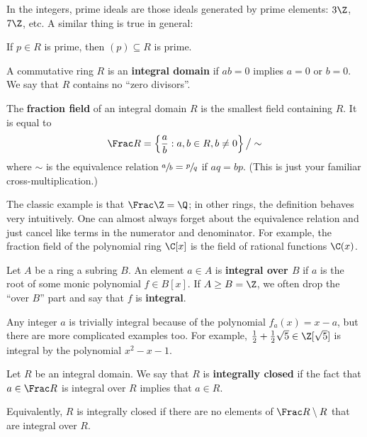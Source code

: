 In the integers, prime ideals are those ideals generated by prime elements: $3 \Z$, $7 \Z$, etc. A similar thing is true in general:

\begin{lemma}
    \label{lem:prime-elements-generate-prime-ideals}
    If $p \in R$ is prime, then $(p) \subseteq R$ is prime.
\end{lemma}

\begin{definition}
    A commutative ring $R$ is an \textbf{integral domain} if $ab = 0$ implies $a = 0$ or $b = 0$. We say that $R$ contains no ``zero divisors''.
\end{definition}

\begin{definition}
    The \textbf{fraction field} of an integral domain $R$ is the smallest field containing $R$. It is equal to
    \begin{equation}
        \Frac R = \left\{ \frac a b : a, b \in R, b \neq 0 \right\} \big/ \sim
    \end{equation}
    where $\sim$ is the equivalence relation $\sfrac ab = \sfrac pq$ if $aq = bp$. (This is just your familiar cross-multiplication.)
\end{definition}

The classic example is that $\Frac \Z = \Q$; in other rings, the definition behaves very intuitively. One can almost always forget about the equivalence relation and just cancel like terms in the numerator and denominator. For example, the fraction field of the polynomial ring $\C[x]$ is the field of rational functions $\C(x)$.

\begin{definition}
    \label{def:integral-element}
    Let $A$ be a ring a subring $B$. An element $a \in A$ is \textbf{integral over $B$} if $a$ is the root of some monic polynomial $f \in B[x]$. If $A \geq B = \Z$, we often drop the ``over $B$'' part and say that $f$ is \textbf{integral}.
\end{definition}

Any integer $a$ is trivially integral because of the polynomial $f_a(x) = x - a$, but there are more complicated examples too.
For example, $\frac12 + \frac12 \sqrt 5 \in \Z[\sqrt5]$ is integral by the polynomial $x^2 - x - 1$.

\begin{definition}
    \label{def:integrally-closed}
    Let $R$ be an integral domain. We say that $R$ is \textbf{integrally closed} if the fact that $a \in \Frac R$ is integral over $R$ implies that $a \in R$.

    Equivalently, $R$ is integrally closed if there are no elements of $\Frac R \setminus R$ that are integral over $R$.
\end{definition}

